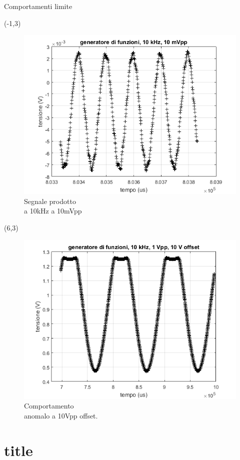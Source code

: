 \documentclass{beamer}
\begin{document}
\begin{frame}{Comportamenti limite}
\begin{textblock}{12}(-1,3)
\begin{figure}
\centering
\includegraphics[width=0.6\linewidth]{./prova_gen_10khz_10mpp}
\caption{Segnale prodotto \\
a 10kHz a 10mVpp}
\label{fig:prova_gen_10khz_10mpp}
\end{figure}
\end{textblock}

\begin{textblock}{12}(6,3)
\begin{figure}
\centering
\includegraphics[width=0.6\linewidth]{./sballato}
\caption{Comportamento \\
anomalo a 10Vpp offset.}
\label{fig:sballato}
\end{figure}
\end{textblock}

\end{frame}




\section{title}
\end{document}
